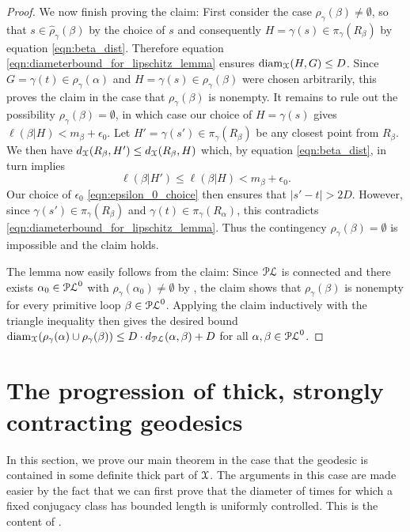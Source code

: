 \documentclass[letterpaper,fleqn]{article}
\theoremstyle{plain}
\theoremstyle{definition}
\DeclareMathOperator{\diam}{diam}
\newcommand{\abs}[1]{\left\vert#1\right\vert}
\newcommand{\pl}{{\EuScript{PL}}} %
\newcommand{\os}{{\EuScript X}} %
\newcommand{\X}{\os}
\newcommand{\len}{\ell}  %
\newcommand{\cp}{\pi} %
\newcommand{\minlen}{m}  %
\newcommand{\minpts}{\rho} %
\newcommand{\mintime}{\hat{\minpts}} %
\renewcommand{\diam}{\mathrm{diam}}
\begin{document}
\begin{proof}
We now finish proving the claim: First consider the case $\minpts_\gamma(\beta)\neq \emptyset$, so that $s\in \mintime_\gamma(\beta)$ by the choice of $s$ and consequently $H = \gamma(s)\in \cp_\gamma(R_\beta)$ by equation \eqref{eqn:beta_dist}. Therefore equation \eqref{eqn:diameterbound_for_lipschitz_lemma} ensures $\diam_\os(H,G)\le D$. Since $G=\gamma(t)\in \minpts_\gamma(\alpha)$ and $H = \gamma(s)\in \minpts_\gamma(\beta)$ were chosen arbitrarily, this proves the claim in the case that $\minpts_\gamma(\beta)$ is nonempty. It remains to rule out the possibility $\minpts_\gamma(\beta) = \emptyset$, in which case our choice of $H = \gamma(s)$ gives $\len(\beta\vert H) < \minlen_\beta + \epsilon_0$. Let $H' = \gamma(s')\in \cp_\gamma(R_\beta)$ be any closest point from $R_\beta$. We then have $d_\os(R_\beta,H')\le d_\os(R_\beta,H)$ which, by equation \eqref{eqn:beta_dist}, in turn implies
\[\len(\beta\vert H') \le \len(\beta \vert H) < \minlen_\beta + \epsilon_0.\]
Our choice of $\epsilon_0$ \eqref{eqn:epsilon_0_choice} then ensures that $\abs{s'- t} > 2D$. However, since $\gamma(s')\in \cp_\gamma(R_\beta)$ and $\gamma(t)\in \cp_\gamma(R_\alpha)$, this contradicts \eqref{eqn:diameterbound_for_lipschitz_lemma}. Thus the contingency $\minpts_\gamma(\beta) = \emptyset$ is impossible and the claim holds.

The lemma now easily follows from the claim: Since $\pl$ is connected and there exists $\alpha_0\in\pl^0$ with $\minpts_\gamma(\alpha_0)\neq\emptyset$ by , the claim shows that $\minpts_\gamma(\beta)$ is nonempty for every primitive loop $\beta\in\pl^0$. Applying the claim inductively with the triangle inequality then gives the desired bound $\diam_\os(\minpts_\gamma(\alpha)\cup\minpts_\gamma(\beta)) \le D\cdot d_\pl(\alpha,\beta) + D$ for all $\alpha,\beta\in\pl^0$.
\end{proof}


\section{The progression of thick, strongly contracting geodesics}
In this section, we prove our main theorem in the case that the geodesic is contained in some definite thick part of $\X$. The arguments in this case are made easier by the fact that we can first prove that the diameter of times for which a fixed conjugacy class has bounded length is uniformly controlled. This is the content of .
\end{document}

